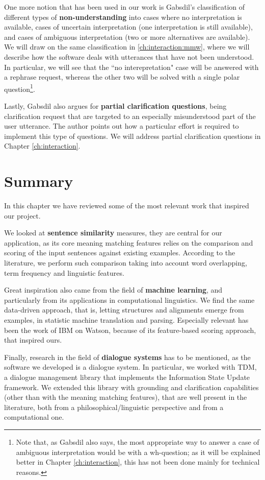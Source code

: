 One more notion that has been used in our work is Gabsdil's classification of different types of \textbf{non-understanding} into cases where no interpretation is available, cases of uncertain interpretation (one interpretation is still available), and cases of ambiguous interpretation (two or more alternatives are available). We will draw on the same classification in \ref{ch:interaction:mmw}, where we will describe how the software deals with utterances that have not been understood. In particular, we will see that the ``no interepretation" case will be answered with a rephrase request, whereas the other two will be solved with a single polar question\footnote{Note that, as Gabsdil also says, the most appropriate way to answer a case of ambiguous interpretation would be with a wh-question; as it will be explained better in Chapter \ref{ch:interaction}, this has not been done mainly for technical reasons.}.

Lastly, Gabsdil also argues for \textbf{partial clarification questions}, being clarification request that are targeted to an especially misunderstood part of the user utterance. The author points out how a particular effort is required to implement this type of questions. We will address partial clarification questions in Chapter \ref{ch:interaction}.

\section{Summary}
In this chapter we have reviewed some of the most relevant work that inspired our project.

We looked at \textbf{sentence similarity} measures, they are central for our application, as its core meaning matching features relies on the comparison and scoring of the input sentences against existing examples. According to the literature, we perform such comparison taking into account word overlapping, term frequency and linguistic features.

Great inspiration also came from the field of \textbf{machine learning}, and particularly from its applications in computational linguistics. We find the same data-driven approach, that is, letting structures and alignments emerge from examples, in statistic machine translation and parsing. Especially relevant has been the work of IBM on Watson, because of its feature-based scoring approach, that inspired ours.

Finally, research in the field of \textbf{dialogue systems} has to be mentioned, as the software we developed is a dialogue system. In particular, we worked with TDM, a dialogue management library that implements the Information State Update framework. We extended this library with grounding and clarification capabilities (other than with the meaning matching features), that are well present in the literature, both from a philosophical/linguistic perspective and from a computational one.
